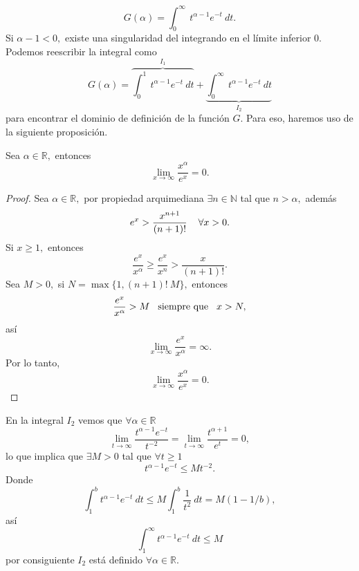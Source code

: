 \begin{equation}
	G(\alpha) = \int_{0}^{\infty}\ t^{\alpha - 1}e^{-t}\ dt.
\end{equation}
Si $\alpha - 1 < 0,$ existe una singularidad del integrando en el límite inferior $0.$ Podemos reescribir la integral como \[G(\alpha) = \overbrace{\int_{0}^{1}\ t^{\alpha - 1}e^{-t}\ dt}^{I_1} + \underbrace{\int_{0}^{\infty}\ t^{\alpha - 1}e^{-t}\ dt}_{I_2}\] para encontrar el dominio de definición de la función $G.$ Para eso, haremos uso de la siguiente proposición.
\begin{proposition}
	Sea $\alpha \in \mathbb{R},$ entonces $$\lim_{x \rightarrow \infty} \frac{x^\alpha}{e^x} = 0.$$ 
\end{proposition}
\begin{proof}
	Sea $\alpha \in \mathbb{R},$ por propiedad arquimediana $\exists n \in \mathbb{N}$ tal que $n > \alpha,$ además $$e^x > \frac{x^{n+1}}{(n+1)!}\hspace{0.4cm}\forall x > 0.$$ Si $x \geq 1,$ entonces $$\frac{e^x}{x^\alpha} \geq \frac{e^x}{x^n} > \frac{x}{(n+1)!}.$$
	Sea $M > 0,$ si $N = \max \{1, (n+1)!\ M\},$ entonces $$\frac{e^x}{x^\alpha} > M\hspace{0.3cm}\textrm{siempre que}\hspace{0.3cm}x > N,$$ así $$\lim_{x \rightarrow \infty}\frac{e^x}{x^\alpha} = \infty.$$ Por lo tanto, $$\lim_{x \rightarrow \infty} \frac{x^\alpha}{e^x} = 0.$$
\end{proof}
En la integral $I_2$ vemos que $\forall \alpha \in \mathbb{R}$ $$\lim_{t \rightarrow \infty}\frac{t^{\alpha - 1}e^{-t}}{t^{-2}} = \lim_{t \rightarrow \infty}\frac{t^{\alpha + 1}}{e^t} = 0,$$ lo que implica que $\exists M > 0$ tal que $\forall t \geq 1$ $$t^{\alpha - 1}e^{-t} \leq Mt^{-2}.$$ Donde $$\int_{1}^{b}t^{\alpha - 1}e^{-t}\ dt \leq M\int_{1}^{b}\frac{1}{t^2}\ dt = M(1- 1/b),$$ así $$\int_{1}^{\infty}t^{\alpha - 1}e^{-t}\ dt \leq M$$ por consiguiente $I_2$ está definido $\forall \alpha \in \mathbb{R}.$

